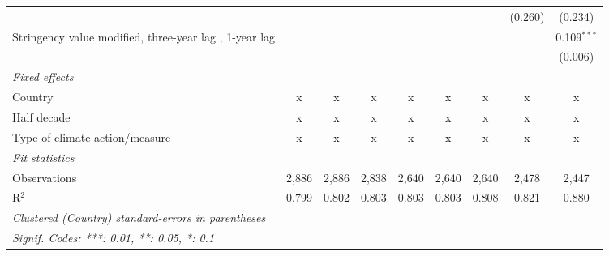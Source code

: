 \begin{table}[htbp]
\begin{tabular}{lcccccccc}
                                                                                           &               &                &               &               &               &               & (0.260)        & (0.234)\\   
      Stringency value modified, three-year lag , 1-year lag                               &               &                &               &               &               &               &                & 0.109$^{***}$\\   
                                                                                           &               &                &               &               &               &               &                & (0.006)\\   
      \emph{Fixed effects}\\
      Country                                                                              & x             & x              & x             & x             & x             & x             & x              & x\\  
      Half decade                                                                          & x             & x              & x             & x             & x             & x             & x              & x\\  
      Type of climate action/measure                                                       & x             & x              & x             & x             & x             & x             & x              & x\\  
      \midrule \emph{Fit statistics}\\
      Observations                                                                         & 2,886         & 2,886          & 2,838         & 2,640         & 2,640         & 2,640         & 2,478          & 2,447\\  
      R$^2$                                                                                & 0.799         & 0.802          & 0.803         & 0.803         & 0.803         & 0.808         & 0.821          & 0.880\\  
      \midrule
      \multicolumn{9}{l}{\emph{Clustered (Country) standard-errors in parentheses}}\\
      \multicolumn{9}{l}{\emph{Signif. Codes: ***: 0.01, **: 0.05, *: 0.1}}\\
   \end{tabular}
\end{table}


